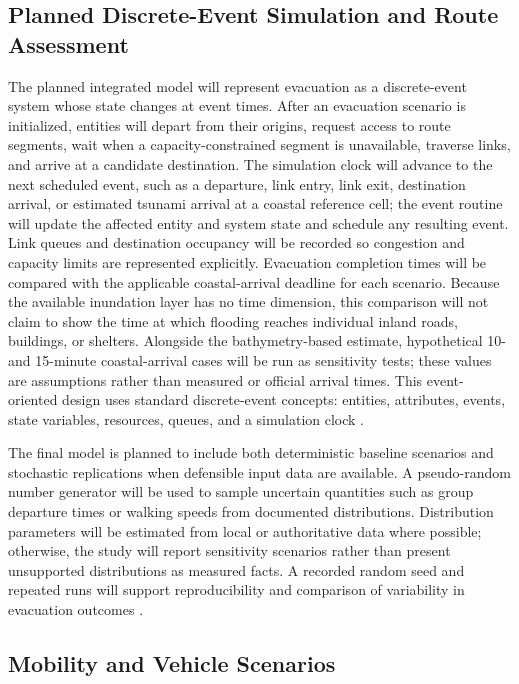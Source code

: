 \documentclass[conference]{IEEEtran}
\begin{document}
\subsection{Planned Discrete-Event Simulation and Route Assessment}

The planned integrated model will represent evacuation as a discrete-event system whose state changes at event times. After an evacuation scenario is initialized, entities will depart from their origins, request access to route segments, wait when a capacity-constrained segment is unavailable, traverse links, and arrive at a candidate destination. The simulation clock will advance to the next scheduled event, such as a departure, link entry, link exit, destination arrival, or estimated tsunami arrival at a coastal reference cell; the event routine will update the affected entity and system state and schedule any resulting event. Link queues and destination occupancy will be recorded so congestion and capacity limits are represented explicitly. Evacuation completion times will be compared with the applicable coastal-arrival deadline for each scenario. Because the available inundation layer has no time dimension, this comparison will not claim to show the time at which flooding reaches individual inland roads, buildings, or shelters. Alongside the bathymetry-based estimate, hypothetical 10- and 15-minute coastal-arrival cases will be run as sensitivity tests; these values are assumptions rather than measured or official arrival times. This event-oriented design uses standard discrete-event concepts: entities, attributes, events, state variables, resources, queues, and a simulation clock \cite{sadeghi,noaaprop}.

The final model is planned to include both deterministic baseline scenarios and stochastic replications when defensible input data are available. A pseudo-random number generator will be used to sample uncertain quantities such as group departure times or walking speeds from documented distributions. Distribution parameters will be estimated from local or authoritative data where possible; otherwise, the study will report sensitivity scenarios rather than present unsupported distributions as measured facts. A recorded random seed and repeated runs will support reproducibility and comparison of variability in evacuation outcomes \cite{sadeghi}.

\subsection{Mobility and Vehicle Scenarios}
\end{document}
